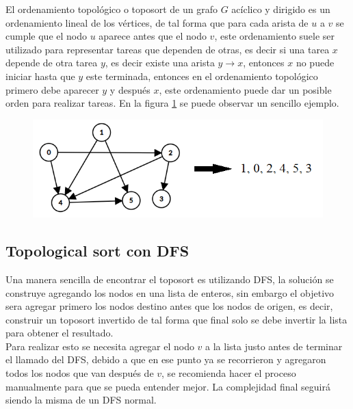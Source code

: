 \documentclass[12pt, a4paper]{article}
\newcommand\cppfile[2][]{

}
\begin{document}
	El ordenamiento topológico o toposort de un grafo $G$ acíclico y dirigido es un ordenamiento lineal de los 
	vértices, de tal forma que para cada arista de $u$ a $v$ se cumple que el nodo $u$ aparece antes que el nodo $v$,
	este ordenamiento suele ser utilizado para representar tareas que dependen de otras, es decir si una tarea $x$
	depende de otra tarea $y$, es decir existe una arista $y \rightarrow x$, entonces $x$ no puede iniciar hasta que 
	$y$ este terminada, entonces en el ordenamiento topológico primero debe aparecer $y$ y después $x$, este 
	ordenamiento puede dar un posible orden para realizar tareas. En la figura 
	\ref{grafos:toposort:ejemplo} se puede observar un sencillo ejemplo.
	
	\begin{figure}[!htb]
		\centering
		\includegraphics[scale=0.9]{Grafos/imagenes/toposort/ejemplo}
		\caption{}
		\label{grafos:toposort:ejemplo}
	\end{figure}
	
	\subsection{Topological sort con DFS}
	\label{grafos:toposort:DFS}
	
	Una manera sencilla de encontrar el toposort es utilizando DFS, la solución se construye agregando los nodos 
	en una lista de enteros, sin embargo el objetivo sera agregar primero los nodos 
	destino antes que los nodos de origen, es decir, construir un toposort invertido de tal forma que final solo 
	se debe invertir la lista para obtener el resultado.\\
	
	Para realizar esto se necesita agregar el nodo $v$ a la 
	lista justo antes de terminar el llamado del DFS, debido a que en ese punto ya se recorrieron y agregaron todos 
	los nodos que van después de $v$, se recomienda hacer el proceso manualmente para que se pueda entender mejor.
	La complejidad final seguirá siendo la misma de un DFS normal.
	
	\cppfile[8-29]{Grafos/codigos/Toposort_dfs.cpp}
	
\end{document}
